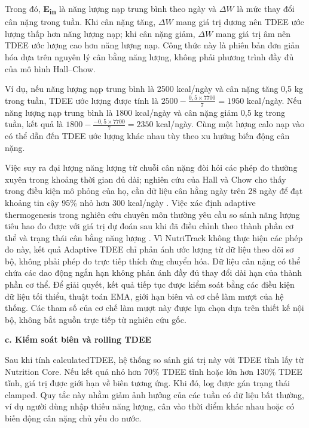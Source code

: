 \documentclass[12pt, a4paper]{report}
\begin{document}
Trong đó, \textbf{E\textsubscript{in}} là năng lượng nạp trung bình theo ngày và \textbf{$\Delta W$} là mức thay đổi cân nặng trong tuần. Khi cân nặng tăng, \textbf{$\Delta W$} mang giá trị dương nên TDEE ước lượng thấp hơn năng lượng nạp; khi cân nặng giảm, \textbf{$\Delta W$} mang giá trị âm nên TDEE ước lượng cao hơn năng lượng nạp. Công thức này là phiên bản đơn giản hóa dựa trên nguyên lý cân bằng năng lượng, không phải phương trình đầy đủ của mô hình Hall--Chow.

Ví dụ, nếu năng lượng nạp trung bình là 2500 kcal/ngày và cân nặng tăng 0,5 kg trong tuần, TDEE ước lượng được tính là $2500 - \frac{0,5 \times 7700}{7} = 1950$ kcal/ngày. Nếu năng lượng nạp trung bình là 1800 kcal/ngày và cân nặng giảm 0,5 kg trong tuần, kết quả là $1800 - \frac{-0,5 \times 7700}{7} = 2350$ kcal/ngày. Cùng một lượng calo nạp vào có thể dẫn đến TDEE ước lượng khác nhau tùy theo xu hướng biến động cân nặng.

Việc suy ra đại lượng năng lượng từ chuỗi cân nặng đòi hỏi các phép đo thường xuyên trong khoảng thời gian đủ dài; nghiên cứu của Hall và Chow cho thấy trong điều kiện mô phỏng của họ, cần dữ liệu cân hằng ngày trên 28 ngày để đạt khoảng tin cậy 95\% nhỏ hơn 300 kcal/ngày \cite{hall_chow_2011}. Việc xác định adaptive thermogenesis trong nghiên cứu chuyên môn thường yêu cầu so sánh năng lượng tiêu hao đo được với giá trị dự đoán sau khi đã điều chỉnh theo thành phần cơ thể và trạng thái cân bằng năng lượng \cite{nunes2022}. Vì NutriTrack không thực hiện các phép đo này, kết quả Adaptive TDEE chỉ phản ánh ước lượng từ dữ liệu theo dõi sơ bộ, không phải phép đo trực tiếp thích ứng chuyển hóa. Dữ liệu cân nặng có thể chứa các dao động ngắn hạn không phản ánh đầy đủ thay đổi dài hạn của thành phần cơ thể. Để giải quyết, kết quả tiếp tục được kiểm soát bằng các điều kiện dữ liệu tối thiểu, thuật toán EMA, giới hạn biên và cơ chế làm mượt của hệ thống. Các tham số của cơ chế làm mượt này được lựa chọn dựa trên thiết kế nội bộ, không bắt nguồn trực tiếp từ nghiên cứu gốc.

\textbf{c. Kiểm soát biên và rolling TDEE}

Sau khi tính calculatedTDEE, hệ thống so sánh giá trị này với TDEE tĩnh lấy từ Nutrition Core. Nếu kết quả nhỏ hơn 70\% TDEE tĩnh hoặc lớn hơn 130\% TDEE tĩnh, giá trị được giới hạn về biên tương ứng. Khi đó, log được gán trạng thái clamped. Quy tắc này nhằm giảm ảnh hưởng của các tuần có dữ liệu bất thường, ví dụ người dùng nhập thiếu năng lượng, cân vào thời điểm khác nhau hoặc có biến động cân nặng chủ yếu do nước.
\end{document}

